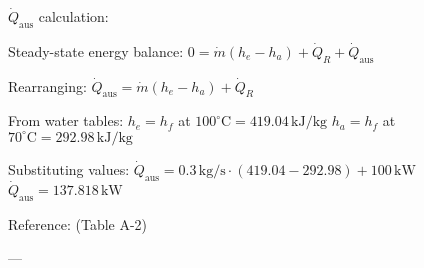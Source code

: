 \( \dot{Q}_{\text{aus}} \) calculation:  

Steady-state energy balance:  
\( 0 = \dot{m} (h_e - h_a) + \dot{Q}_R + \dot{Q}_{\text{aus}} \)  

Rearranging:  
\( \dot{Q}_{\text{aus}} = \dot{m} (h_e - h_a) + \dot{Q}_R \)  

From water tables:  
\( h_e = h_f \) at \( 100^\circ \text{C} = 419.04 \, \text{kJ/kg} \)  
\( h_a = h_f \) at \( 70^\circ \text{C} = 292.98 \, \text{kJ/kg} \)  

Substituting values:  
\( \dot{Q}_{\text{aus}} = 0.3 \, \text{kg/s} \cdot (419.04 - 292.98) + 100 \, \text{kW} \)  
\( \dot{Q}_{\text{aus}} = 137.818 \, \text{kW} \)  

Reference: (Table A-2)  

---
